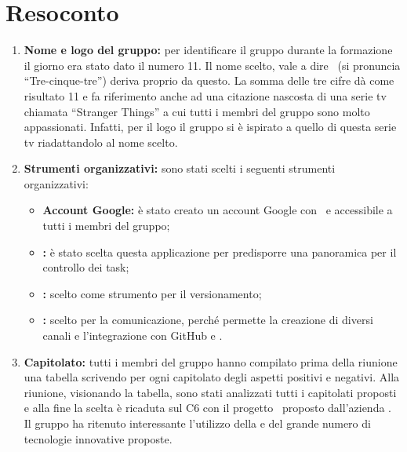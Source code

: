 \documentclass[VER-2017-12-08.tex]{subfiles}
\begin{document}
\chapter{Resoconto}
\begin{enumerate}
	\item \textbf{Nome e logo del gruppo:} per identificare il gruppo durante la formazione il giorno  era stato dato il numero 11. Il nome scelto, vale a dire \gruppo\ (si pronuncia ``Tre-cinque-tre'') deriva proprio da questo. La somma delle tre cifre dà come risultato 11 e fa riferimento anche ad una citazione nascosta di una serie tv chiamata ``Stranger Things'' a cui tutti i membri del gruppo sono molto appassionati. Infatti, per il logo il gruppo si è ispirato a quello di questa serie tv riadattandolo al nome scelto.
	\item \textbf{Strumenti organizzativi:} sono stati scelti i seguenti strumenti organizzativi:
	\begin{itemize}
		\item \textbf{Account Google:} è stato creato un account Google con  \mailgroup\ e accessibile a tutti i membri del gruppo;
		\item \textbf{:} è stato scelta questa applicazione per predisporre una panoramica per il controllo dei task;
		\item \textbf{:} scelto come strumento per il versionamento;
		\item \textbf{:} scelto per la comunicazione, perché permette la creazione di diversi canali e l'integrazione con GitHub e .
	\end{itemize}
	\item \textbf{Capitolato:} tutti i membri del gruppo hanno compilato prima della riunione una tabella scrivendo per ogni capitolato degli aspetti positivi e negativi. Alla riunione, visionando la tabella, sono stati analizzati tutti i capitolati proposti e alla fine la scelta è ricaduta sul C6 con il progetto \progetto\ proposto dall'azienda \Proponente. Il gruppo ha ritenuto interessante l'utilizzo della   e del grande numero di tecnologie innovative proposte. 
\end{enumerate} 
\end{document}
